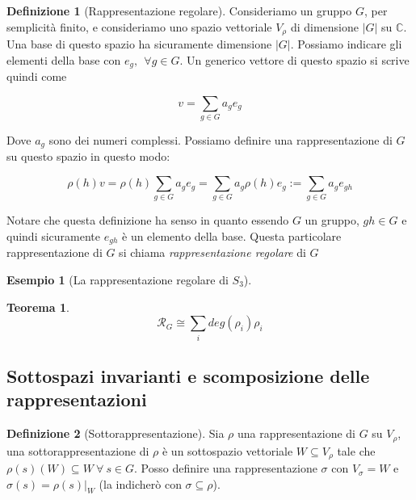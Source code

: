 \documentclass[11pt]{article}
\theoremstyle{plain}
\newtheorem{thm}{Teorema}[section]
\theoremstyle{definition}
\newtheorem{defn}{Definizione}[section]
\newtheorem{exmp}{Esempio}[section]
\theoremstyle{remark}
\newcommand{\C}{\mathbb{C}}
\newcommand{\dsum}{\displaystyle\sum}
\begin{document}
\begin{defn}[Rappresentazione regolare]
  Consideriamo un gruppo $G$, per semplicità finito, e consideriamo uno spazio vettoriale $V_\rho$ di dimensione $|G|$ su $\C$. Una base di questo spazio ha sicuramente dimensione $|G|$. Possiamo indicare gli elementi della base con $e_g, \ \ \forall g \in G$. Un generico vettore di questo spazio si scrive quindi come

  \[ v = \dsum_{g \in G} a_g e_g \]

  Dove $a_g$ sono dei numeri complessi. Possiamo definire una rappresentazione di $G$ su questo spazio in questo modo:

  \[ \rho(h)v = \rho(h) \dsum_{g \in G} a_g e_g = \dsum_{g\in G} a_g \rho(h) e_g := \dsum_{g \in G} a_g e_{gh} \]

  Notare che questa definizione ha senso in quanto essendo $G$ un gruppo, $gh \in G$ e quindi sicuramente $e_{gh}$ è un elemento della base. Questa particolare rappresentazione di $G$ si chiama \emph{rappresentazione regolare} di $G$


  
  \label{defn:rappresentazione regolare}
\end{defn}

\begin{exmp}[La rappresentazione regolare di $S_3$]


\end{exmp}


\begin{thm}

\[\mathcal{R}_G \cong \dsum_i deg(\rho_i) \rho_i \]

\end{thm}



\subsection{Sottospazi invarianti e scomposizione delle rappresentazioni}



\begin{defn}[Sottorappresentazione]
Sia $\rho$ una rappresentazione di $G$ su $V_{\rho}$, una sottorappresentazione di $\rho$ è un sottospazio vettoriale $W\subseteq V_{\rho}$ tale che $\rho(s)(W)\subseteq W\ \forall\ s\in G$. Posso definire una rappresentazione $\sigma$ con $V_{\sigma}=W$ e $\sigma(s)=\rho(s)|_W$ (la indicherò con $\sigma\subseteq \rho$).
\end{defn}
\end{document}
